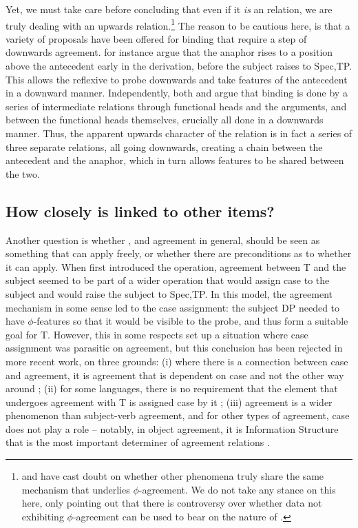 \documentclass[output=paper
,modfonts
,nonflat]{langsci/langscibook}
\begin{document}
Yet, we must take care before concluding that even if it \emph{is} an {\agr} relation, we are truly dealing with an upwards {\agr} relation.\footnote{\citet{Preminger2013} and \citet{premingerpolinsky2015} have cast doubt on whether other phenomena truly share the same mechanism that underlies $\phi$-agreement.
	We do not take any stance on this here, only pointing out that there is controversy over whether data not exhibiting $\phi$-agreement can be used to bear on the nature of {\agr}.}
The reason to be cautious here, is that a variety of proposals have been offered for binding that require a step of downwards agreement.
\citet{rooryckvandenwyngaerd} for instance argue that the anaphor rises to a position above the antecedent early in the derivation, before the subject raises to Spec,TP.
This allows the reflexive to probe downwards and take features of the antecedent in a downward manner.
Independently, both \citet{reuland2001,reuland2011} and \citet{kratzer2009} argue that binding is done by a series of intermediate relations through functional heads and the arguments, and between the functional heads themselves, crucially all done in a downwards manner.
Thus, the apparent upwards character of the {\agr} relation is in fact a series of three separate {\agr} relations, all going downwards, creating a chain between the antecedent and the anaphor, which in turn allows features to be shared between the two.

\subsection{How closely is {\agr} linked to other items?}
\label{sec:parasitic}

Another question is whether {\agr}, and agreement in general, should be seen as something that can apply freely, or whether there are preconditions as to whether it can apply.
When \citet{Chomsky2000,Chomsky2001} first introduced the {\agr} operation, agreement between T and the subject seemed to be part of a wider operation that would assign case to the subject and would raise the subject to Spec,TP.
In this model, the agreement mechanism in some sense led to the case assignment: the subject DP needed to have $\phi$-features so that it would be visible to the probe, and thus form a suitable goal for T.
However, this in some respects set up a situation where case assignment was parasitic on agreement, but this conclusion has been rejected in more recent work, on three grounds: (i) where there is a connection between case and agreement, it is agreement that is dependent on case and not the other way around \citep{Bobaljik2008,preminger2011,preminger2015}; (ii) for some languages, there is no requirement that the element that undergoes agreement with T is assigned case by it \citep{baker2008}; (iii) agreement is a wider phenomenon than subject-verb agreement, and for other types of agreement, case does not play a role -- notably, in object agreement, it is Information Structure that is the most important determiner of agreement relations \citep{dn2011}.
\end{document}
